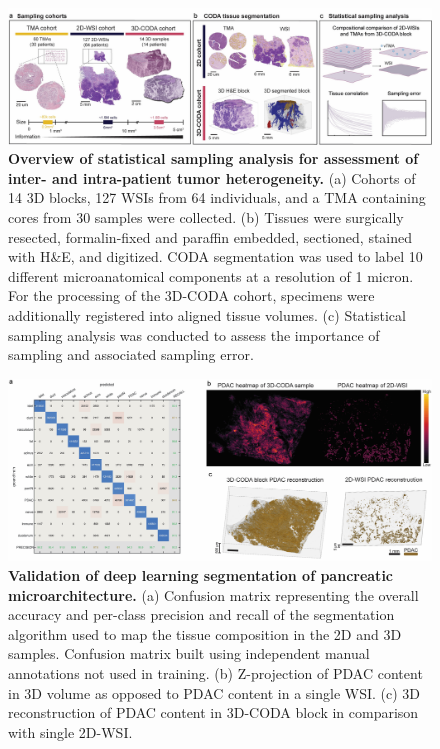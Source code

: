 \begin{refsection}
    \begin{figure}[h!]
        \begin{center}
            \includegraphics[width=\textwidth,clip,page=1] {figures/chapter2/PDAC_Fig_1.jpg}
            \caption{\textbf{Overview of statistical sampling analysis for assessment of inter- and intra-patient tumor heterogeneity.} (a) Cohorts of 14 3D blocks, 127 WSIs from 64 individuals, and a TMA containing cores from 30 samples were collected. (b) Tissues were surgically resected, formalin-fixed and paraffin embedded, sectioned, stained with H\&E, and digitized. CODA segmentation was used to label 10 different microanatomical components at a resolution of 1 micron. For the processing of the 3D-CODA cohort, specimens were additionally registered into aligned tissue volumes. (c) Statistical sampling analysis was conducted to assess the importance of sampling and associated sampling error.}
            \label{chapter2_fig1}
        \end{center}
    \end{figure}
    
    \begin{figure}[h!]
        \begin{center}
            \includegraphics[width=\textwidth,clip,page=1] {figures/chapter2/PDAC_Fig_S1.jpg}
            \caption{\textbf{Validation of deep learning segmentation of pancreatic microarchitecture.} (a) Confusion matrix representing the overall accuracy and per-class precision and recall of the segmentation algorithm used to map the tissue composition in the 2D and 3D samples. Confusion matrix built using independent manual annotations not used in training. (b) Z-projection of PDAC content in 3D volume as opposed to PDAC content in a single WSI. (c) 3D reconstruction of PDAC content in 3D-CODA block in comparison with single 2D-WSI.}
            \label{chapter2_figS1}
        \end{center}
    \end{figure}
    

\end{refsection}
